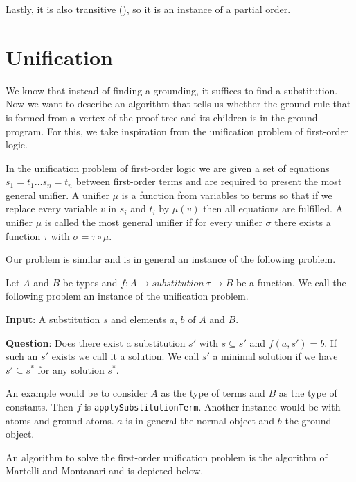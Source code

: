     Lastly, it is also transitive (\substitutionsubstrans), so it is an instance of a partial order.

\section{Unification}

We know that instead of finding a grounding, it suffices to find a substitution. Now we want to describe an algorithm that tells us whether the ground rule that is formed from a vertex of the proof tree and its children is in the ground program. For this, we take inspiration from the unification problem of first-order logic.

In the unification problem of first-order logic we are given a set of equations $s_1 = t_1 \dots s_n = t_n$ between first-order terms and are required to present the most general unifier. A unifier $\mu$ is a function from variables to terms so that if we replace every variable $v$ in $s_i$ and $t_i$ by $\mu (v)$ then all equations are fulfilled. A unifier $\mu$ is called the most general unifier if for every unifier $\sigma$ there exists a function $\tau$ with $\sigma = \tau \circ \mu$.

Our problem is similar and is in general an instance of the following problem.

\begin{definition}
    Let $A$ and $B$ be types and $f: A \to substitution\ \tau \to B$ be a function. We call the following problem an instance of the unification problem.

    \textbf{Input}: A substitution $s$ and elements $a$, $b$ of $A$ and $B$.

    \textbf{Question}: Does there exist a substitution $s'$ with $s \subseteq s'$ and $f(a, s') = b$. If such an $s'$ exists we call it a solution. We call $s'$ a minimal solution if we have $s' \subseteq s^\ast$ for any solution $s^\ast$.
\end{definition}

An example would be to consider $A$ as the type of terms and $B$ as the type of constants. Then $f$ is \lstinline|applySubstitutionTerm|. Another instance would be with atoms and ground atoms. $a$ is in general the normal object and $b$ the ground object.

An algorithm to solve the first-order unification problem is the algorithm of Martelli and Montanari \cite{MartMont} and is depicted below.


